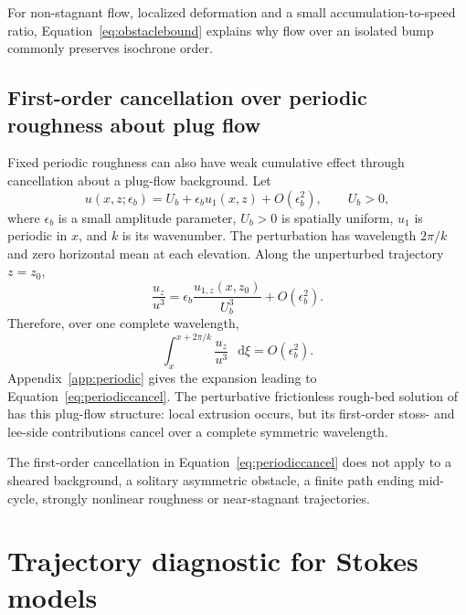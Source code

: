 \documentclass[review]{igs}
\begin{document}
For non-stagnant flow, localized deformation and a small accumulation-to-speed ratio, Equation~\ref{eq:obstaclebound} explains why flow over an isolated bump commonly preserves isochrone order.

\subsection{First-order cancellation over periodic roughness about plug flow}

Fixed periodic roughness can also have weak cumulative effect through cancellation about a plug-flow background. Let
\begin{equation}
 u(x,z;\epsilon_b)=U_b+\epsilon_b u_1(x,z)+O(\epsilon_b^2),
 \qquad U_b>0,
\label{eq:plugperturbation}
\end{equation}
where \(\epsilon_b\) is a small amplitude parameter, \(U_b>0\) is spatially uniform, \(u_1\) is periodic in \(x\), and \(k\) is its wavenumber. The perturbation has wavelength \(2\pi/k\) and zero horizontal mean at each elevation. Along the unperturbed trajectory \(z=z_0\),
\begin{equation}
\frac{u_z}{u^3}
=\epsilon_b\frac{u_{1,z}(x,z_0)}{U_b^3}+O(\epsilon_b^2).
\label{eq:periodicshear}
\end{equation}
Therefore, over one complete wavelength,
\begin{equation}
\int_{x}^{x+2\pi/k}\frac{u_z}{u^3}\,\mathop{}\!\mathrm{d}\xi=O(\epsilon_b^2).
\label{eq:periodiccancel}
\end{equation}
Appendix~\ref{app:periodic} gives the expansion leading to Equation~\ref{eq:periodiccancel}. The perturbative frictionless rough-bed solution of \citet{Gudmundsson1997linear} has this plug-flow structure: local extrusion occurs, but its first-order stoss- and lee-side contributions cancel over a complete symmetric wavelength.

The first-order cancellation in Equation~\ref{eq:periodiccancel} does not apply to a sheared background, a solitary asymmetric obstacle, a finite path ending mid-cycle, strongly nonlinear roughness or near-stagnant trajectories.

\section{Trajectory diagnostic for Stokes models}
\end{document}
